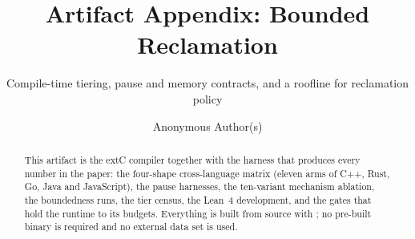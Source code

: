 \documentclass[acmsmall,10pt,nonacm]{acmart}
\newcommand{\code}[1]{\texttt{\detokenize{#1}}}
\begin{document}
\title{Artifact Appendix: Bounded Reclamation}
\subtitle{Compile-time tiering, pause and memory contracts, and a roofline for reclamation policy}
\author{Anonymous Author(s)}

\begin{abstract}
This artifact is the extC compiler together with the harness that produces every number in the paper:
the four-shape cross-language matrix (eleven arms of C++, Rust, Go, Java and JavaScript), the pause
harnesses, the ten-variant mechanism ablation, the boundedness runs, the tier census, the Lean~4
development, and the gates that hold the runtime to its budgets.  Everything is built from source with
\code{make}; no pre-built binary is required and no external data set is used.
\end{abstract}

\maketitle
\end{document}
